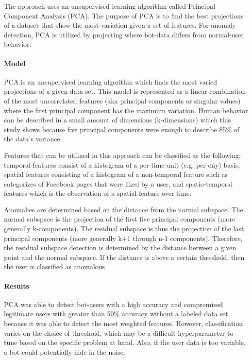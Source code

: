 \documentclass[11pt, oneside]{article}   	%
\begin{document}
\quad The \cite{pca} approach uses an unsupervised learning algorithm called Principal Component Analysis (PCA).
The purpose of PCA is to find the best projections of a dataset that show the most variation given a set of features.
For anomaly detection, PCA is utilized by projecting where bot-data differs from normal-user behavior.

\paragraph{Model}
\quad

\quad PCA is an unsupervised learning algorithm which finds the most varied projections of a given data set.
This model is represented as a linear combination of the most uncorrelated features (aka principal components or singular values) where the first principal component has the maximum variation.
Human behavior can be described in a small amount of dimensions (k-dimensions) which this study shows because five principal components were enough to describe 85\% of the data's variance.

\quad Features that can be utilized in this approach can be classified as the following: temporal features consist of a histogram of a per-time-unit (e.g. per-day) basis, spatial features consisting of a histogram of a non-temporal feature such as categorizes of Facebook pages that were liked by a user, and spatio-temporal features which is the observation of a spatial feature over time.

\quad Anomalies are determined based on the distance from the normal subspace.
The normal subspace is the projection of the first five principal components (more generally k-components).
The residual subspace is thus the projection of the last principal components (more generally k+1 through n-1 components).
Therefore, the residual subspace detection is determined by the distance between a given point and the normal subspace.
If the distance is above a certain threshold, then the user is classified as anomalous.

\paragraph{Results}
\quad

\quad PCA was able to detect bot-users with a high accuracy and compromised legitimate users with greater than 50\% accuracy without a labeled data set because it was able to detect the most weighted features.
However, classification varies on the choice of threshold, which may be a difficult hyperparameter to tune based on the specific problem at hand.
Also, if the user data is too variable, a bot could potentially hide in the noise.
\end{document}
